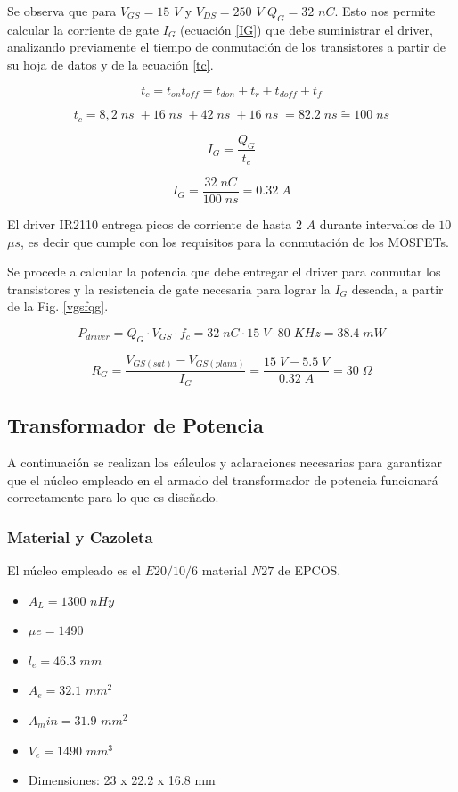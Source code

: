 \documentclass[11pt, a4paper]{article}
\begin{document}
Se observa que para $V_{GS} = 15$ $V$ y $V_{DS} = 250$ $V$ $Q_G = 32$ $nC$. Esto nos permite calcular la corriente de gate $I_G$ (ecuación \ref{IG}) que debe suministrar el driver, analizando previamente el tiempo de conmutación de los transistores a partir de su hoja de datos y de la ecuación \ref{tc}.

\begin{equation}
t_c = t_{on} t_{off} = t_{don} + t_{r} + t_{doff} + t_f
\label{tc} 
\end{equation}

\[ t_c = 8,2 \; ns\; + 16 \; ns\; + 42 \; ns\; + 16 \; ns\; = 82.2 \; ns \tilde{=} 100 \; ns \]

\begin{equation}
I_G = \frac{Q_G}{t_c} 
\label{IG} 
\end{equation}

\[ I_G = \frac{32 \; nC}{100 \; ns} = 0.32 \; A \]

El driver IR2110 entrega picos de corriente de hasta $2$ $A$ durante intervalos de $10$ $\mu s$, es decir que cumple con los requisitos para la conmutación de los MOSFETs.

Se procede a calcular la potencia que debe entregar el driver para conmutar los transistores y la resistencia de gate necesaria para lograr la $I_G$ deseada, a partir de la Fig. \ref{vgsfqg}.

\[ P_{driver} = Q_G \cdot V_{GS} \cdot f_c = 32 \; nC \cdot 15 \; V \cdot 80 \; KHz = 38.4 \; mW \]

\[ R_G = \frac{V_{GS(sat)} - V_{GS(plana)}}{I_G} = \frac{15 \; V - 5.5 \; V}{0.32 \; A} = 30 \; \Omega  \]

\subsection{Transformador de Potencia}
A continuación se realizan los cálculos y aclaraciones necesarias para garantizar que el núcleo empleado en el armado del transformador de potencia funcionará correctamente para lo que es diseñado.
\subsubsection{Material y Cazoleta}
El núcleo empleado es el $E20/10/6$ material $N27$ de EPCOS.
\begin{itemize}
	\item $A_L = 1300$ $nHy$
	\item $\mu e = 1490$
	\item $\mathit{l}_e = 46.3$ $mm$
	\item $A_e = 32.1$ $mm^2$
	\item $A_min = 31.9$ $mm^2$
	\item $V_e = 1490$ $mm^3$
	\item Dimensiones: 23 x 22.2 x 16.8 mm  
\end{itemize}
\end{document}
